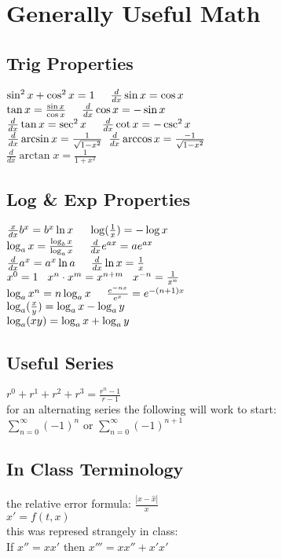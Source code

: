 \section{Generally Useful Math}
\subsection*{Trig Properties}
$\sin^2x + \cos^2x = 1 \hspace{5mm} \frac{d}{dx}\sin x= \cos x$\\
$\tan x = \frac{\sin x}{\cos x} \hspace{5mm} \frac{d}{dx}\cos x= - \sin x$\\
$\frac{d}{dx}\tan x = \sec^2 x \hspace{5mm} \frac{d}{dx}\cot x = - \csc^2 x$\\
$\frac{d}{dx} \arcsin x = \frac{1}{\sqrt{1 - x^2}}  \hspace{2mm}   \frac{d}{dx} \arccos x = \frac{-1}{\sqrt{1 - x^2}}  $\\
$\frac{d}{dx} \arctan x = \frac{1}{1 + x^2}      $\\

\subsection*{Log \& Exp Properties}
$\frac{x}{dx} b^x = b^x \ln x \hspace{5mm} \log(\frac{1}{x}) = - \log x$\\
$\log_ax = \frac{\log_bx}{\log_ax} \hspace{5mm} \frac{d}{dx}e^{ax} = ae^{ax}$\\
$\frac{d}{dx}a^{x} = a^{x} \ln a \hspace{5mm} \frac{d}{dx} \ln x = \frac{1}{x} $\\
$x^0 = 1 \hspace{3mm} x^n \cdot x^m = x^{n+m} \hspace{3mm} x^{-n} = \frac{1}{x^n}    $\\
$\log_a x^n = n \log_a x \hspace{5mm} \frac{e^{-n x}}{e^x} = e^{-(n+1)x}    $\\
$\log_a (\frac{x}{y}) = \log_a x - \log_a y \hspace{2mm}  $\\
$\log_a (xy) = \log_a x + \log_a y \hspace{2mm}  $\\

\subsection*{Useful Series}
$r^0 + r^1 + r^2 + r^3 = \frac{r^n - 1}{r - 1}$\\
for an alternating series the following will work to start:\\
$ \sum_{n=0}^{\infty} (-1)^n $ or $ \sum_{n=0}^{\infty} (-1)^{n+1} $\\

\subsection*{In Class Terminology}
the relative error formula:
$ \frac{|x - \hat{x}|}{x} $\\
$ x' = f(t,x)    $\\
this was represed strangely in class:\\
If $x'' =  xx'$ then $x''' = xx'' + x'x'$
